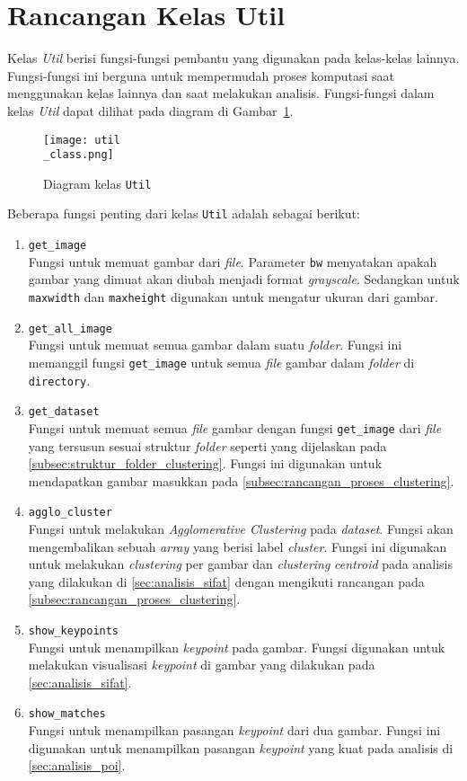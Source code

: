 \section{Rancangan Kelas Util}
Kelas \textit{Util} berisi fungsi-fungsi pembantu yang digunakan pada kelas-kelas lainnya. Fungsi-fungsi ini berguna untuk mempermudah proses komputasi saat menggunakan kelas lainnya dan saat melakukan analisis. Fungsi-fungsi dalam kelas \textit{Util} dapat dilihat pada diagram di Gambar~\ref{fig:util_class}.
\begin{figure}[H]
	\centering
	\texttt{[image: util\\\_class.png]}
	\caption{Diagram kelas \texttt{Util}}
	\label{fig:util_class}
\end{figure}
Beberapa fungsi penting dari kelas \texttt{Util} adalah sebagai berikut:
\begin{enumerate}
	\item \texttt{get\_image} \\
	Fungsi untuk memuat gambar dari \textit{file}. Parameter \texttt{bw} menyatakan apakah gambar yang dimuat akan diubah menjadi format \textit{grayscale}. Sedangkan untuk \texttt{maxwidth} dan \texttt{maxheight} digunakan untuk mengatur ukuran dari gambar.
	\item \texttt{get\_all\_image} \\
	Fungsi untuk memuat semua gambar dalam suatu \textit{folder}. Fungsi ini memanggil fungsi \texttt{get\_image} untuk semua \textit{file} gambar dalam \textit{folder} di \texttt{directory}.
	\item \texttt{get\_dataset} \\
	Fungsi untuk memuat semua \textit{file} gambar dengan fungsi \texttt{get\_image} dari \textit{file} yang tersusun sesuai struktur \textit{folder} seperti yang dijelaskan pada \ref{subsec:struktur_folder_clustering}. Fungsi ini digunakan untuk mendapatkan gambar masukkan pada \ref{subsec:rancangan_proses_clustering}.
	\item \texttt{agglo\_cluster} \\
	Fungsi untuk melakukan \textit{Agglomerative Clustering} pada \textit{dataset}. Fungsi akan mengembalikan sebuah \textit{array} yang berisi label \textit{cluster}. Fungsi ini digunakan untuk melakukan \textit{clustering} per gambar dan \textit{clustering} \textit{centroid} pada analisis yang dilakukan di \ref{sec:analisis_sifat} dengan mengikuti rancangan pada \ref{subsec:rancangan_proses_clustering}.
	\item \texttt{show\_keypoints} \\
	Fungsi untuk menampilkan \textit{keypoint} pada gambar. Fungsi digunakan untuk melakukan visualisasi \textit{keypoint} di gambar yang dilakukan pada \ref{sec:analisis_sifat}.
	\item \texttt{show\_matches} \\
	Fungsi untuk menampilkan pasangan \textit{keypoint} dari dua gambar. Fungsi ini digunakan untuk menampilkan pasangan \textit{keypoint} yang kuat pada analisis di \ref{sec:analisis_poi}.
\end{enumerate}


